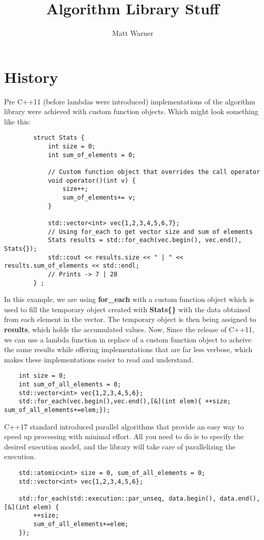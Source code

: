 \documentclass{report}
\title{\Huge{Algorithm Library Stuff}}
\author{\huge{Matt Warner}}
\date{\huge{}}
\begin{document}
    \maketitle
    \section{History}
    Pre C++11 (before lambdas were introduced) implementations of the algorithm library were achieved with custom function objects. Which might look something like this:
    \begin{verbatim}
        struct Stats {
            int size = 0;
            int sum_of_elements = 0;

            // Custom function object that overrides the call operator
            void operator()(int v) {
                size++;
                sum_of_elements+= v;
            }
            
            std::vector<int> vec{1,2,3,4,5,6,7};
            // Using for_each to get vector size and sum of elements
            Stats results = std::for_each(vec.begin(), vec.end(), Stats{});
            std::cout << results.size << " | " << results.sum_of_elements << std::endl;
            // Prints -> 7 | 28 
        } ;
    \end{verbatim}
        In this example, we are using \textbf{for\_each} with a custom function object which is used to fill the temporary object created with \textbf{Stats\{\}} with the data obtained from each element in the vector. The temporary object is then being assigned to \textbf{results}, which holds the accumulated values.
    \bigbreak \noindent
    Now, Since the release of C++11, we can use a lambda function in replace of a custom function object to acheive the same results while offering implementations that are far less verbose, which makes these implementations easier to read and understand.
    \begin{verbatim}
    int size = 0;
    int sum_of_all_elements = 0;
    std::vector<int> vec{1,2,3,4,5,6};
    std::for_each(vec.begin(),vec.end(),[&](int elem){ ++size; sum_of_all_elements+=elem;});
    \end{verbatim}
\bigbreak \noindent \bigbreak \noindent
C++17 standard introduced parallel algorithms that provide an easy way to speed up processing with minimal effort. All you need to do is to specify the desired execution model, and the library will take care of parallelizing the execution.
\begin{verbatim}
    std::atomic<int> size = 0, sum_of_all_elements = 0;
    std::vector<int> vec{1,2,3,4,5,6};

    std::for_each(std::execution::par_unseq, data.begin(), data.end(),[&](int elem) {
        ++size;
        sum_of_all_elements+=elem;
    });
\end{verbatim}
\end{document}
